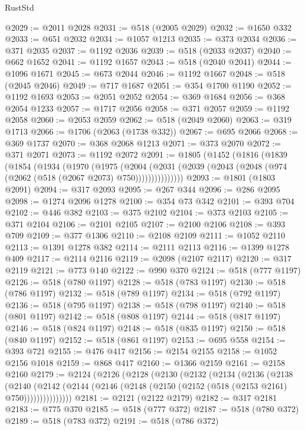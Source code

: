 \begin{lexlean}{RustStd}
\begin{coremodule}
{\begin{coremodule}
{{{{{{{{{{{{{{{{{{{{{{{{{{{{{{{{{{{{{{{{{{{{{{{{{{@2029 := @2011 @2028
@2031 := @518 (@2005 @2029)
@2032 := @1650 @332
@2033 := @651 @2032
@2034 := @1057 @1213
@2035 := @373 @2034
@2036 := @371 @2035
@2037 := @1192 @2036
@2039 := @518 (@2033 @2037)
@2040 := @662 @1652
@2041 := @1192 @1657
@2043 := @518 (@2040 @2041)
@2044 := @1096 @1671
@2045 := @673 @2044
@2046 := @1192 @1667
@2048 := @518 (@2045 @2046)
@2049 := @717 @1687
@2051 := @354 @1700 @1190
@2052 := @1192 @1693
@2053 := @2051 @2052
@2054 := @369 @1684
@2056 := @368 @2054 @1233
@2057 := @1717 @2056
@2058 := @371 @2057
@2059 := @1192 @2058
@2060 := @2053 @2059
@2062 := @518 (@2049 @2060)
@2063 := @319 @1713
@2066 := @1706 (@2063 (@1738 @332))
@2067 := @695 @2066
@2068 := @369 @1737
@2070 := @368 @2068 @1213
@2071 := @373 @2070
@2072 := @371 @2071
@2073 := @1192 @2072
@2091 := @1805
    (@1452
      (@1816
        (@1839
          (@1854
            (@1934
              (@1970
                (@1975
                  (@2004
                    (@2031 (@2039 (@2043 (@2048 (@974 (@2062 (@518 (@2067 @2073) @750)))))))))))))))
@2093 := @1801 (@1803 @2091)
@2094 := @317 @2093
@2095 := @267 @344
@2096 := @286 @2095
@2098 := @1274 @2096 @1278
@2100 := @354 @73 @342
@2101 := @393 @704
@2102 := @446 @382
@2103 := @375 @2102
@2104 := @373 @2103
@2105 := @371 @2104
@2106 := @2101 @2105
@2107 := @2100 @2106
@2108 := @393 @709
@2109 := @377 @1306
@2110 := @2108 @2109
@2111 := @1052 @2110
@2113 := @1391 @1278 @382
@2114 := @2111 @2113
@2116 := @1399 @1278 @409
@2117 := @2114 @2116
@2119 := @2098 (@2107 @2117)
@2120 := @317 @2119
@2121 := @773 @140
@2122 := @990 @370
@2124 := @518 (@777 @1197)
@2126 := @518 (@780 @1197)
@2128 := @518 (@783 @1197)
@2130 := @518 (@786 @1197)
@2132 := @518 (@789 @1197)
@2134 := @518 (@792 @1197)
@2136 := @518 (@795 @1197)
@2138 := @518 (@798 @1197)
@2140 := @518 (@801 @1197)
@2142 := @518 (@808 @1197)
@2144 := @518 (@817 @1197)
@2146 := @518 (@824 @1197)
@2148 := @518 (@835 @1197)
@2150 := @518 (@840 @1197)
@2152 := @518 (@861 @1197)
@2153 := @695 @558
@2154 := @393 @721
@2155 := @476 @417
@2156 := @2154 @2155
@2158 := @1052 @2156 @1018
@2159 := @868 @417
@2160 := @1366 @2159
@2161 := @2158 @2160
@2179 := @2124
    (@2126
      (@2128
        (@2130
          (@2132
            (@2134
              (@2136
                (@2138
                  (@2140
                    (@2142
                      (@2144 (@2146 (@2148 (@2150 (@2152 (@518 (@2153 @2161) @750)))))))))))))))
@2181 := @2121 (@2122 @2179)
@2182 := @317 @2181
@2183 := @775 @370
@2185 := @518 (@777 @372)
@2187 := @518 (@780 @372)
@2189 := @518 (@783 @372)
@2191 := @518 (@786 @372)
}}}}}}}}}}}}}}}}}}}}}}}}}}}}}}}}}}}}}}}}}}}}}}}}}}
\end{coremodule}}
\end{coremodule}
\end{lexlean}
